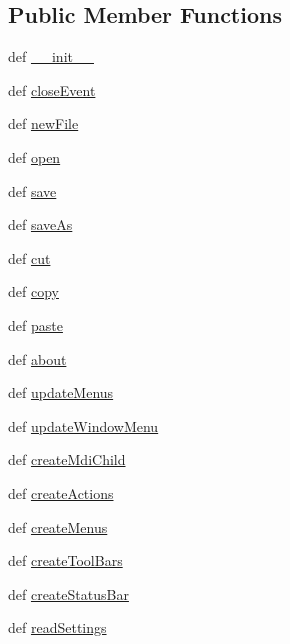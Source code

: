 \subsection*{Public Member Functions}
\begin{DoxyCompactItemize}
\item 
def \hyperlink{classmdi_1_1MainWindow_a701f43ae8aba6fd9e5cc935cde6aef17}{\+\_\+\+\_\+init\+\_\+\+\_\+}
\item 
def \hyperlink{classmdi_1_1MainWindow_afad3b8b9f50c4b9d52c8a888537b1782}{close\+Event}
\item 
def \hyperlink{classmdi_1_1MainWindow_aaa3b3c144f17d2dc0dd09454a4cddf68}{new\+File}
\item 
def \hyperlink{classmdi_1_1MainWindow_afd1415dae0ad3f966b10222d4fdd3c89}{open}
\item 
def \hyperlink{classmdi_1_1MainWindow_a0f473e2353a27da2d3f00b6c56748d64}{save}
\item 
def \hyperlink{classmdi_1_1MainWindow_a0082330d1bffa2aafa979e33f9af29cc}{save\+As}
\item 
def \hyperlink{classmdi_1_1MainWindow_a95736f65bd93f95a9dc640530959aa1c}{cut}
\item 
def \hyperlink{classmdi_1_1MainWindow_a1c82017f34fcd0c26ac6398c33d82e31}{copy}
\item 
def \hyperlink{classmdi_1_1MainWindow_ae7320e57838d6668ab98a3283bf7a8fe}{paste}
\item 
def \hyperlink{classmdi_1_1MainWindow_afdb3902592d3d4ce2ee526b67da20758}{about}
\item 
def \hyperlink{classmdi_1_1MainWindow_a2cd33fd7a8cd4dbfe9aefe3daed08716}{update\+Menus}
\item 
def \hyperlink{classmdi_1_1MainWindow_a96393ff9aca075dfbe12633cbfbf611a}{update\+Window\+Menu}
\item 
def \hyperlink{classmdi_1_1MainWindow_aec4aef5a0c70c418448494ca22a05ed3}{create\+Mdi\+Child}
\item 
def \hyperlink{classmdi_1_1MainWindow_a1db7b922d70e8a08be9f0237cf4ed84f}{create\+Actions}
\item 
def \hyperlink{classmdi_1_1MainWindow_ad9f5f69a238440479f46315d223769df}{create\+Menus}
\item 
def \hyperlink{classmdi_1_1MainWindow_a2652e686c702d0967264000d30c7fbb9}{create\+Tool\+Bars}
\item 
def \hyperlink{classmdi_1_1MainWindow_aa74e7fb6612d1963fdcd977c71b59d63}{create\+Status\+Bar}
\item 
def \hyperlink{classmdi_1_1MainWindow_a753f2a18d2382be880c1a4cd69173515}{read\+Settings}

\end{DoxyCompactItemize}
